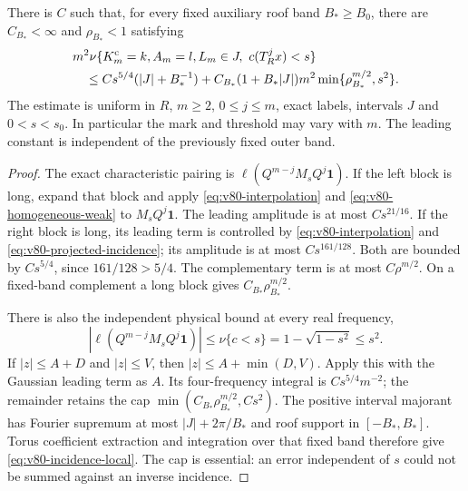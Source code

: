 \begin{theorem}
\label{thm:v80-superlinear-incidence}
There is $C$ such that, for every fixed auxiliary roof band $B_*\ge B_0$,
there are $C_{B_*}<\infty$ and $\rho_{B_*}<1$ satisfying
\begin{align}
 &m^2\nu\{K_m^{\rm c}=k,A_m=l,L_m\in J,\ c(T_R^jx)<s\}
                                                        \notag\\
 &\quad\le Cs^{5/4}(|J|+B_*^{-1})
  +C_{B_*}(1+B_*|J|)m^2
                   \min\{\rho_{B_*}^{m/2},s^2\}.       \label{eq:v80-incidence-local}
\end{align}
The estimate is uniform in $R$, $m\ge2$, $0\le j\le m$, exact
labels, intervals $J$ and $0<s<s_0$. In particular the mark and
threshold may vary with $m$. The leading constant is independent
of the previously fixed outer band.
\end{theorem}
\begin{proof}
The exact characteristic pairing is
$\ell(Q^{m-j}M_sQ^j\mathbf1)$. If the left block is long, expand
that block and apply \eqref{eq:v80-interpolation} and
\eqref{eq:v80-homogeneous-weak} to $M_sQ^j\mathbf1$.
The leading amplitude is at most $Cs^{21/16}$. If the right block
is long, its leading term is controlled by
\eqref{eq:v80-interpolation} and \eqref{eq:v80-projected-incidence};
its amplitude is at most $Cs^{161/128}$. Both are bounded by
$Cs^{5/4}$, since $161/128>5/4$. The complementary term is at most
$C\rho^{m/2}$. On a fixed-band complement a long block gives
$C_{B_*}\rho_{B_*}^{m/2}$.

There is also the independent physical bound at every real frequency,
\[
 |\ell(Q^{m-j}M_sQ^j\mathbf1)|
        \le\nu\{c<s\}=1-\sqrt{1-s^2}\le s^2.
\]
If $|z|\le A+D$ and $|z|\le V$, then
$|z|\le A+\min(D,V)$. Apply this with the Gaussian leading term
as $A$. Its four-frequency integral is $Cs^{5/4}m^{-2}$; the
remainder retains the cap $\min(C_{B_*}\rho_{B_*}^{m/2},Cs^2)$.
The positive interval majorant has Fourier supremum at most
$|J|+2\pi/B_*$ and roof support in $[-B_*,B_*]$. Torus coefficient
extraction and integration over that fixed band therefore give
\eqref{eq:v80-incidence-local}. The cap is essential: an error
independent of $s$ could not be summed against an inverse incidence.
\end{proof}
